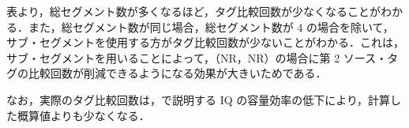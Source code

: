 表より，総セグメント数が多くなるほど，タグ比較回数が少なくなることがわかる．また，総セグメント数が同じ場合，総セグメント数が 4 の場合を除いて，サブ・セグメントを使用する方がタグ比較回数が少ないことがわかる．これは，サブ・セグメントを用いることによって，（NR，NR）の場合に第 2 ソース・タグの比較回数が削減できるようになる効果が大きいためである．

なお，実際のタグ比較回数は，で説明する IQ の容量効率の低下により，計算した概算値よりも少なくなる．